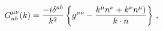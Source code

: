 \begin{equation}  \label{prop}
G^{\mu\nu}_{ab}(k) = \frac {-i\delta ^{ab}}{k^2}\left \{g^{\mu\nu}-\frac{%
k^\mu n^\nu+k^\nu n^\mu)}{k\cdot n}\right \}\,,
\end{equation}

